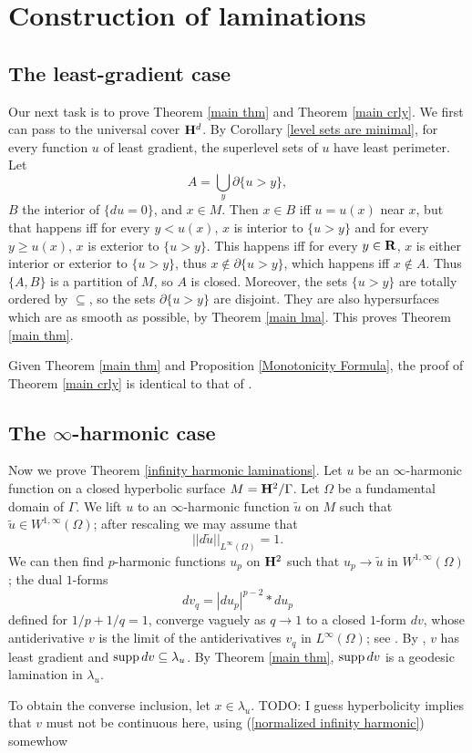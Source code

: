 \section{Construction of laminations} \label{proof of main thm}

\subsection{The least-gradient case}
Our next task is to prove Theorem \ref{main thm} and Theorem \ref{main crly}.
We first can pass to the universal cover $\mathbf H^d$.
By Corollary \ref{level sets are minimal}, for every function $u$ of least gradient, the superlevel sets of $u$ have least perimeter.
Let
\begin{equation}\label{lamination union}
A = \bigcup_y \partial \{u > y\},
\end{equation} $B$ the interior of $\{du = 0\}$, and $x \in M$.
Then $x \in B$ iff $u = u(x)$ near $x$, but that happens iff for every $y < u(x)$, $x$ is interior to $\{u > y\}$ and for every $y \geq u(x)$, $x$ is exterior to $\{u > y\}$.
This happens iff for every $y \in \mathbf{R}$, $x$ is either interior or exterior to $\{u > y\}$, thus $x \notin \partial \{u > y\}$, which happens iff $x \notin A$.
Thus $\{A, B\}$ is a partition of $M$, so $A$ is closed.
Moreover, the sets $\{u > y\}$ are totally ordered by $\subseteq$, so the sets $\partial \{u > y\}$ are disjoint.
They are also hypersurfaces which are as smooth as possible, by Theorem \ref{main lma}.
This proves Theorem \ref{main thm}.

Given Theorem \ref{main thm} and Proposition \ref{Monotonicity Formula}, the proof of Theorem \ref{main crly} is identical to that of \cite[Proposition 3.4]{górny2017planar}.

\subsection{The $\infty$-harmonic case}
Now we prove Theorem \ref{infinity harmonic laminations}.
Let $u$ be an $\infty$-harmonic function on a closed hyperbolic surface $M = \mathbf H^2/\Gamma$.
Let $\Omega$ be a fundamental domain of $\Gamma$.
We lift $u$ to an $\infty$-harmonic function $\tilde u$ on $M$ such that $\tilde u \in W^{1, \infty}(\Omega)$; after rescaling we may assume that
\begin{equation}\label{normalized infinity harmonic}
    ||d\tilde u||_{L^\infty(\Omega)} = 1.
\end{equation}
We can then find $p$-harmonic functions $u_p$ on $\mathbf H^2$ such that $u_p \to \tilde u$ in $W^{1, \infty}(\Omega)$; the dual $1$-forms
\begin{equation}\label{conjugate harmonic eqn}
    dv_q = |du_p|^{p - 2} * du_p
\end{equation}
defined for $1/p + 1/q = 1$, converge vaguely as $q \to 1$ to a closed $1$-form $dv$, whose antiderivative $v$ is the limit of the antiderivatives $v_q$ in $L^\infty(\Omega)$; see \cite[\S4]{daskalopoulos2020transverse}.
By \cite[\S6]{daskalopoulos2020transverse}, $v$ has least gradient and $\operatorname{supp} dv \subseteq \lambda_u$.
By Theorem \ref{main thm}, $\operatorname{supp} dv$ is a geodesic lamination in $\lambda_u$.

To obtain the converse inclusion, let $x \in \lambda_u$. TODO: I guess hyperbolicity implies that $v$ must not be continuous here, using (\ref{normalized infinity harmonic}) somewhow